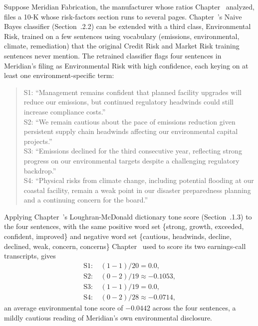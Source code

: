 \documentclass[../ai_in_finance]{subfiles}
\begin{document}
Suppose Meridian Fabrication, the manufacturer whose ratios Chapter~ analyzed, files a 10-K whose risk-factors section runs to several pages. Chapter~'s Naive Bayes classifier (Section~.2.2) can be extended with a third class, Environmental Risk, trained on a few sentences using vocabulary (emissions, environmental, climate, remediation) that the original Credit Risk and Market Risk training sentences never mention. The retrained classifier flags four sentences in Meridian's filing as Environmental Risk with high confidence, each keying on at least one environment-specific term:

\begin{quote}
\small
S1: ``Management remains confident that planned facility upgrades will reduce our emissions, but continued regulatory headwinds could still increase compliance costs.''\\
S2: ``We remain cautious about the pace of emissions reduction given persistent supply chain headwinds affecting our environmental capital projects.''\\
S3: ``Emissions declined for the third consecutive year, reflecting strong progress on our environmental targets despite a challenging regulatory backdrop.''\\
S4: ``Physical risks from climate change, including potential flooding at our coastal facility, remain a weak point in our disaster preparedness planning and a continuing concern for the board.''
\end{quote}

Applying Chapter~'s Loughran-McDonald dictionary tone score (Section~.1.3) to the four sentences, with the same positive word set \{strong, growth, exceeded, confident, improved\} and negative word set \{cautious, headwinds, decline, declined, weak, concern, concerns\} Chapter~ used to score its two earnings-call transcripts, gives
\begin{align*}
\text{S1: } & (1-1)/20 = 0.0, \\
\text{S2: } & (0-2)/19 \approx -0.1053, \\
\text{S3: } & (1-1)/19 = 0.0, \\
\text{S4: } & (0-2)/28 \approx -0.0714,
\end{align*}
an average environmental tone score of $-0.0442$ across the four sentences, a mildly cautious reading of Meridian's own environmental disclosure.
\end{document}
